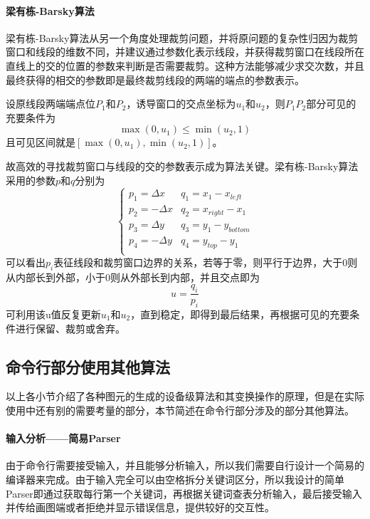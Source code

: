 \documentclass[a4paper,UTF8]{article}
\theoremstyle{definition}
\begin{document}
\paragraph{梁有栋-Barsky算法}
梁有栋-Barsky算法从另一个角度处理裁剪问题，并将原问题的复杂性归因为裁剪窗口和线段的维数不同，并建议通过参数化表示线段，并获得裁剪窗口在线段所在直线上的交的位置的参数来判断是否需要裁剪。这种方法能够减少求交次数，并且最终获得的相交的参数即是最终裁剪线段的两端的端点的参数表示。
\par 设原线段两端端点位$P_1$和$P_2$，诱导窗口的交点坐标为$u_1$和$u_2$，则$P_1P_2$部分可见的充要条件为
\begin{equation}
\max(0,u_1)\leq \min(u_2,1)
\end{equation}
且可见区间就是$[\max(0,u_1),\min(u_2,1)]$。
\par 故高效的寻找裁剪窗口与线段的交的参数表示成为算法关键。梁有栋-Barsky算法采用的参数$p$和$q$分别为
\begin{equation}
\left\{
\begin{array}{ll}
p_1=\Delta x & q_1=x_1-x_{left} \\
p_2=-\Delta x & q_2=x_{right}-x_1 \\
p_3=\Delta y & q_3=y_1-y_{bottom} \\
p_4=-\Delta y & q_4=y_{top}-y_1 \\
\end{array}
\right.
\end{equation}
可以看出$p_i$表征线段和裁剪窗口边界的关系，若等于零，则平行于边界，大于0则从内部长到外部，小于0则从外部长到内部，并且交点即为
\begin{equation}
u=\frac{q_i}{p_i}
\end{equation}
可利用该u值反复更新$u_1$和$u_2$，直到稳定，即得到最后结果，再根据可见的充要条件进行保留、裁剪或舍弃。
\subsection{命令行部分使用其他算法}
以上各小节介绍了各种图元的生成的设备级算法和其变换操作的原理，但是在实际使用中还有别的需要考量的部分，本节简述在命令行部分涉及的部分其他算法。
\paragraph{输入分析——简易Parser} 由于命令行需要接受输入，并且能够分析输入，所以我们需要自行设计一个简易的编译器来完成。由于输入完全可以由空格拆分关键词区分，所以我设计的简单Parser即通过获取每行第一个关键词，再根据关键词查表分析输入，最后接受输入并传给画图端或者拒绝并显示错误信息，提供较好的交互性。
\end{document}
